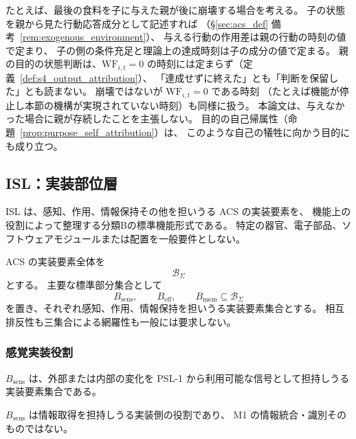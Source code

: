 \begin{remark}[存続の終わりと結果の記述]
\label{rem:result_after_collapse}
たとえば、最後の食料を子に与えた親が後に崩壊する場合を考える。
子の状態を親から見た行動応答成分として記述すれば
（\S\ref{sec:acs_def} 備考~\ref{rem:exogenous_environment}）、
与える行動の作用差は親の行動の時刻の値で定まり、
子の側の条件充足と理論上の達成時刻は子の成分の値で定まる。
親の目的の状態判断は、$\mathrm{WF}_{i,t}=0$ の時刻には定まらず（定義~\ref{def:s4_output_attribution}）、
「達成せずに終えた」とも「判断を保留した」とも読まない。
崩壊ではないが $\mathrm{WF}_{i,t}=0$ である時刻
（たとえば機能が停止し本節の機構が実現されていない時刻）も同様に扱う。
本論文は、与えなかった場合に親が存続したことを主張しない。
目的の自己帰属性（命題~\ref{prop:purpose_self_attribution}）は、
このような自己の犠牲に向かう目的にも成り立つ。
\end{remark}

\subsection{ISL：実装部位層}
\label{subsec:impl}

ISL は、感知、作用、情報保持その他を担いうる ACS の実装要素を、
機能上の役割によって整理する分類Bの標準機能形式である。
特定の器官、電子部品、ソフトウェアモジュールまたは配置を一般要件としない。

\begin{definition}
\label{def:impl_layer}
ACS の実装要素全体を
\[
  \mathcal B_\Sigma
\]
とする。
主要な標準部分集合として
\[
  B_{\mathrm{sens}},
  \qquad
  B_{\mathrm{eff}},
  \qquad
  B_{\mathrm{mem}}
  \subseteq\mathcal B_\Sigma
\]
を置き、それぞれ感知、作用、情報保持を担いうる実装要素集合とする。
相互排反性も三集合による網羅性も一般には要求しない。
\end{definition}

\subsubsection{感覚実装役割}
\label{subsubsec:sensor}

\begin{definition}
\label{def:sensor}
$B_{\mathrm{sens}}$ は、外部または内部の変化を
PSL-1 から利用可能な信号として担持しうる実装要素集合である。
\end{definition}

\begin{remark}
\label{rem:sensor_distinction}
$B_{\mathrm{sens}}$ は情報取得を担持しうる実装側の役割であり、
M1 の情報統合・識別そのものではない。
\end{remark}

